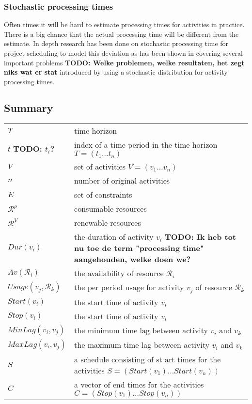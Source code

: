 \documentclass{article}
\newcommand{\TODO}[1]{{\color{red}\textbf{TODO: #1}}}
\begin{document}
\subsubsection{Stochastic processing times}
Often times it will be hard to estimate processing times for activities in practice. There is a big chance that the actual processing time will be  different from the estimate. In depth research has been done on stochastic processing time for project scheduling to model this deviation as has been shown in \cite{brucker99} covering several important problems \TODO{Welke problemen, welke resultaten, het zegt niks wat er stat} introduced by using a stochastic distribution for activity processing times. 

\subsection{Summary}
\begin{tabular}{l l}
\hline
$T$ & time horizon \\
$t$ \TODO{$t_i$?} &  index of a time period in the time horizon $T = (t_1 \ldots t_n)$\\
$V$ & set of activities $V = (v_1 \ldots v_n)$ \\
$n$ & number of original activities \\
$E$ & set of constraints \\
$\mathcal{R}^{\rho}$ & consumable resources \\
$\mathcal{R}^V$ & renewable resources \\
$Dur(v_i)$ & the duration of activity $v_i$ \TODO{Ik heb tot nu toe de term "processing time" aangehouden, welke doen we?}\\
$Av(\mathcal{R}_i)$ & the availability of resource $\mathcal{R}_i$ \\
$Usage(v_j, \mathcal{R}_k)$ & the per period usage for activity $v_j$ of resource $\mathcal{R}_k$ \\
$Start(v_i)$ & the start time of activity $v_i$ \\
$Stop(v_i)$ & the start time of activity $v_i$ \\
$MinLag(v_i, v_j)$ & the minimum time lag between activity $v_i$ and $v_k$ \\
$MaxLag(v_i, v_j)$ & the maximum time lag between activity $v_i$ and $v_k$ \\
$S$ & a schedule consisting of st
art times for the activities $S = (Start(v_1) \ldots Start(v_n))$ \\
$C$ & a vector of end times for the activities $C = (Stop(v_1) \ldots Stop(v_n))$ \\
\hline
\end{tabular}
\end{document}
